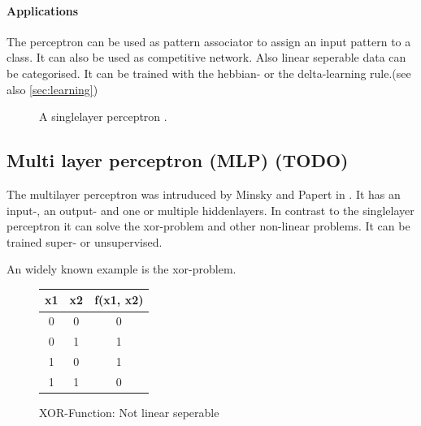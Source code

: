 \documentclass[10pt,a4paper,DIV=11]{scrreprt}
\begin{document}
\paragraph{Applications}
The perceptron can be used as pattern associator to assign an input pattern to a class. It can also be used as competitive network. Also linear seperable data can be categorised.
It can be trained with the hebbian- or the delta-learning rule.(see also \eqref{sec:learning})

\begin{center}
	\begin{figure}[H]
		\centering
		\caption{A singlelayer perceptron \cite{PERSIN}.}
		\label{fig:neuron}
	\end{figure}
\end{center}


\subsection{Multi layer perceptron (MLP) (TODO)} \label{sec:mlp}
The multilayer perceptron was intruduced by Minsky and Papert in . It has an input-, an output- and
one or multiple hiddenlayers. In contrast to the singlelayer perceptron it can solve the xor-problem and other non-linear problems. It can be trained super- or unsupervised.

An widely known example is the xor-problem.

\begin{figure}[H]
	\centering
	\begin{tabular}{|c|c|c|}
		\hline
		x1 & x2 & f(x1, x2)\\
		\hline
		0 & 0 & 0 \\
		\hline
		0 & 1 & 1 \\
		\hline
		1 & 0 & 1 \\
		\hline
		1 & 1 & 0 \\
		\hline
	\end{tabular}
	\caption{XOR-Function: Not linear seperable}
	\label{fig:nlinsep}
	
	
\end{figure}
\end{document}
